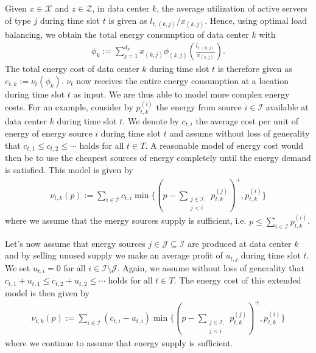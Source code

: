 Given $x \in \mathcal{X}$ and $z \in \mathcal{Z}$, in data center $k$, the average utilization of active servers of type $j$ during time slot $t$ is given as $l_{t,(k,j)} / x_{(k,j)}$. Hence, using optimal load balancing, we obtain the total energy consumption of data center $k$ with \begin{align*}
    \phi_k := \sum_{j=1}^{d_k} x_{(k,j)} \phi_{(k,j)}\left(\frac{l_{t,(k,j)}}{x_{(k,j)}}\right).
\end{align*} The total energy cost of data center $k$ during time slot $t$ is therefore given as $e_{t,k} := \nu_t(\phi_k)$. $\nu_t$ now receives the entire energy consumption at a location during time slot $t$ as input. We are thus able to model more complex energy costs. For an example, consider by $p_{t,k}^{(i)}$ the energy from source $i \in \mathcal{I}$ available at data center $k$ during time slot $t$. We denote by $c_{t,i}$ the average cost per unit of energy of energy source $i$ during time slot $t$ and assume without loss of generality that $c_{t,1} \leq c_{t,2} \leq \cdots$ holds for all $t \in T$. A reasonable model of energy cost would then be to use the cheapest sources of energy completely until the energy demand is satisfied. This model is given by \begin{align*}
    \nu_{t,k}(p) := \sum_{i \in \mathcal{I}} c_{t,i} \min\{(p - \sum_{\substack{j \in \mathcal{I}, \\ j < i}} p_{t,k}^{(j)})^+, p_{t,k}^{(i)}\}
\end{align*} where we assume that the energy sources supply is sufficient, i.e. $p \leq \sum_{i \in \mathcal{I}} p_{t,k}^{(i)}$.

Let's now assume that energy sources $j \in \mathcal{J} \subseteq \mathcal{I}$ are produced at data center $k$ and by selling unused supply we make an average profit of $u_{t,j}$ during time slot $t$. We set $u_{t,i} = 0$ for all $i \in \mathcal{I} \setminus \mathcal{J}$. Again, we assume without loss of generality that $c_{t,1} + u_{t,1} \leq c_{t,2} + u_{t,2} \leq \cdots$ holds for all $t \in T$. The energy cost of this extended model is then given by \begin{align*}
    \nu_{t,k}(p) := \sum_{i \in \mathcal{I}} (c_{t,i} - u_{t,i}) \min\{(p - \sum_{\substack{j \in \mathcal{I}, \\ j < i}} p_{t,k}^{(j)})^+, p_{t,k}^{(i)}\}
\end{align*} where we continue to assume that energy supply is sufficient.

